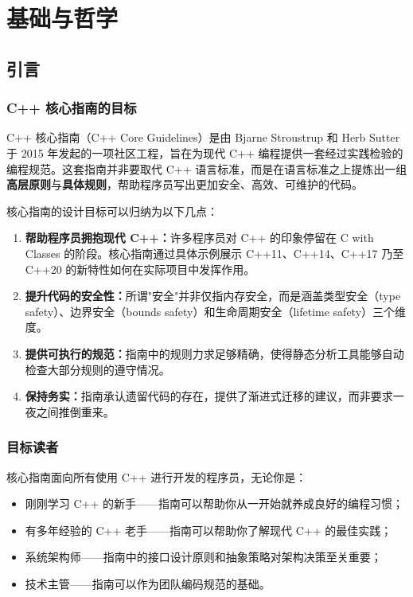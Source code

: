
\part{基础与哲学}

\chapter{引言}

\section{C++ 核心指南的目标}

C++ 核心指南（C++ Core Guidelines）是由 Bjarne Stroustrup 和 Herb Sutter 于 2015 年发起的一项社区工程，旨在为现代 C++ 编程提供一套经过实践检验的编程规范。这套指南并非要取代 C++ 语言标准，而是在语言标准之上提炼出一组\textbf{高层原则}与\textbf{具体规则}，帮助程序员写出更加安全、高效、可维护的代码。

核心指南的设计目标可以归纳为以下几点：

\begin{enumerate}
  \item \textbf{帮助程序员拥抱现代 C++：}许多程序员对 C++ 的印象停留在 C with Classes 的阶段。核心指南通过具体示例展示 C++11、C++14、C++17 乃至 C++20 的新特性如何在实际项目中发挥作用。
  \item \textbf{提升代码的安全性：}所谓"安全"并非仅指内存安全，而是涵盖类型安全（type safety）、边界安全（bounds safety）和生命周期安全（lifetime safety）三个维度。
  \item \textbf{提供可执行的规范：}指南中的规则力求足够精确，使得静态分析工具能够自动检查大部分规则的遵守情况。
  \item \textbf{保持务实：}指南承认遗留代码的存在，提供了渐进式迁移的建议，而非要求一夜之间推倒重来。
\end{enumerate}

\section{目标读者}

核心指南面向所有使用 C++ 进行开发的程序员，无论你是：
\begin{itemize}
  \item 刚刚学习 C++ 的新手——指南可以帮助你从一开始就养成良好的编程习惯；
  \item 有多年经验的 C++ 老手——指南可以帮助你了解现代 C++ 的最佳实践；
  \item 系统架构师——指南中的接口设计原则和抽象策略对架构决策至关重要；
  \item 技术主管——指南可以作为团队编码规范的基础。
\end{itemize}

